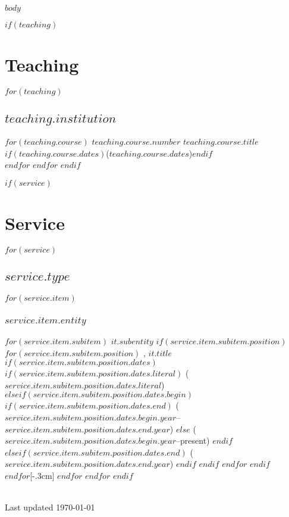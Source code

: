 \documentclass[11pt]{article}
\begin{document}
$body$
\vspace{10pt}

$if(teaching)$
  \section{Teaching}
  $for(teaching)$
    \subsection{$teaching.institution$}
    $for(teaching.course)$
      {\footnotesize $teaching.course.number$}
      \emph{$teaching.course.title$}
      $if(teaching.course.dates)${\small ($teaching.course.dates$)}$endif$\\
    $endfor$
  $endfor$
$endif$

$if(service)$
  \section{Service}
  $for(service)$
    \subsection{$service.type$}
    $for(service.item)$
      \subsubsection*{$service.item.entity$}
      $for(service.item.subitem)$
      \emph{$it.subentity$}\ignorespaces
        $if(service.item.subitem.position)$
          $for(service.item.subitem.position)$
          {\small, $it.title$}
            $if(service.item.subitem.position.dates)$
	      $if(service.item.subitem.position.dates.literal)$
                {\small($service.item.subitem.position.dates.literal$)}\ignorespaces
              $elseif(service.item.subitem.position.dates.begin)$
                $if(service.item.subitem.position.dates.end)$
                  {\small($service.item.subitem.position.dates.begin.year$--$service.item.subitem.position.dates.end.year$)}\ignorespaces
	        $else$
	          {\small($service.item.subitem.position.dates.begin.year$--present)}\ignorespaces
		$endif$
              $elseif(service.item.subitem.position.dates.end)$
                {\small($service.item.subitem.position.dates.end.year$)}\ignorespaces
              $endif$
            $endif$
          $endfor$
	$endif$\\
      $endfor$[-.3cm]
    $endfor$
  $endfor$
$endif$

\vfill
\hrulefill\\
\footnotesize{Last updated \today}
\end{document}
